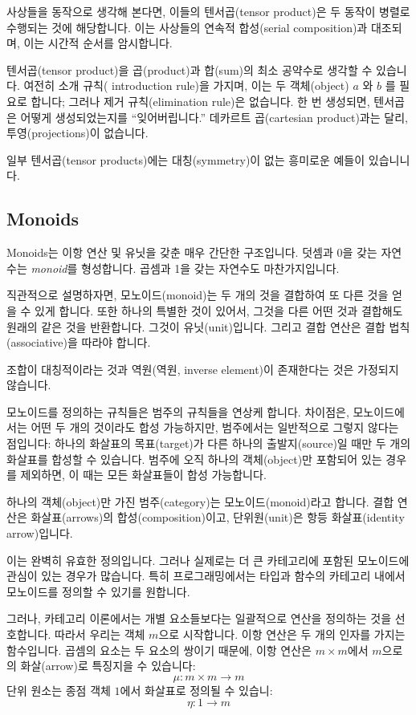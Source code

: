 \documentclass[DaoFP]{subfiles}
\begin{document}
사상들을 동작으로 생각해 본다면, 이들의 텐서곱(tensor product)은 두 동작이 병렬로 수행되는 것에 해당합니다. 이는 사상들의 연속적 합성(serial composition)과 대조되며, 이는 시간적 순서를 암시합니다.

텐서곱(tensor product)을 곱(product)과 합(sum)의 최소 공약수로 생각할 수 있습니 다. 여전히 소개 규칙( introduction rule)을 가지며, 이는 두 객체(object) $a$ 와 $b$ 를 필요로 합니다; 그러나 제거 규칙(elimination rule)은 없습니다. 한 번 생성되면, 텐서곱은 어떻게 생성되었는지를 ``잊어버립니다.'' 데카르트 곱(cartesian product)과는 달리, 투영(projections)이 없습니다.

일부 텐서곱(tensor products)에는 대칭(symmetry)이 없는 흥미로운 예들이 있습니니다.

\subsection{Monoids}

Monoids는 이항 연산 및 유닛을 갖춘 매우 간단한 구조입니다. 덧셈과 0을 갖는 자연수는 \textit{monoid}를 형성합니다. 곱셈과 1을 갖는 자연수도 마찬가지입니다.

직관적으로 설명하자면, 모노이드(monoid)는 두 개의 것을 결합하여 또 다른 것을 얻을 수 있게 합니다. 또한 하나의 특별한 것이 있어서, 그것을 다른 어떤 것과 결합해도 원래의 같은 것을 반환합니다. 그것이 유닛(unit)입니다. 그리고 결합 연산은 결합 법칙(associative)을 따라야 합니다.

조합이 대칭적이라는 것과 역원(역원, inverse element)이 존재한다는 것은 가정되지 않습니다.

모노이드를 정의하는 규칙들은 범주의 규칙들을 연상케 합니다. 차이점은, 모노이드에서는 어떤 두 개의 것이라도 합성 가능하지만, 범주에서는 일반적으로 그렇지 않다는 점입니다: 하나의 화살표의 목표(target)가 다른 하나의 출발지(source)일 때만 두 개의 화살표를 합성할 수 있습니다. 범주에 오직 하나의 객체(object)만 포함되어 있는 경우를 제외하면, 이 때는 모든 화살표들이 합성 가능합니다.

하나의 객체(object)만 가진 범주(category)는 모노이드(monoid)라고 합니다. 결합 연산은 화살표(arrows)의 합성(composition)이고, 단위원(unit)은 항등 화살표(identity arrow)입니다.

이는 완벽히 유효한 정의입니다. 그러나 실제로는 더 큰 카테고리에 포함된 모노이드에 관심이 있는 경우가 많습니다. 특히 프로그래밍에서는 타입과 함수의 카테고리 내에서 모노이드를 정의할 수 있기를 원합니다.

그러나, 카테고리 이론에서는 개별 요소들보다는 일괄적으로 연산을 정의하는 것을 선호합니다. 따라서 우리는 객체 $m$으로 시작합니다. 이항 연산은 두 개의 인자를 가지는 함수입니다. 곱셈의 요소는 두 요소의 쌍이기 때문에, 이항 연산은 $m \times m$에서 $m$으로의 화살(arrow)로 특징지을 수 있습니다:
\[ \mu \colon m \times m \to m \]
단위 원소는 종점 객체 $1$에서 화살표로 정의될 수 있습니:
\[ \eta \colon 1 \to m \]
\end{document}
